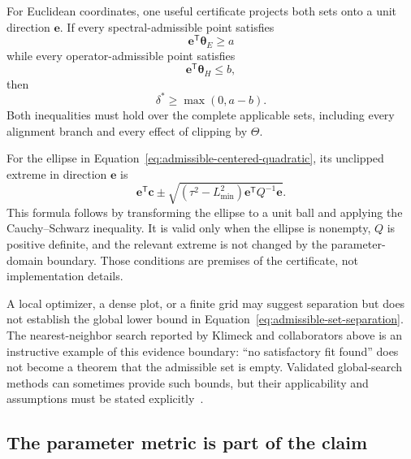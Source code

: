For Euclidean coordinates, one useful certificate projects both sets onto a
unit direction $\mathbf e$. If every spectral-admissible point satisfies
\begin{equation}
  \mathbf e^{\mathsf T}\boldsymbol\theta_E\geq a
\end{equation}
while every operator-admissible point satisfies
\begin{equation}
  \mathbf e^{\mathsf T}\boldsymbol\theta_H\leq b,
\end{equation}
then
\begin{equation}
  \delta^{\ast}\geq\max(0,a-b).
  \label{eq:admissible-directional-lower-bound}
\end{equation}
Both inequalities must hold over the complete applicable sets, including every
alignment branch and every effect of clipping by $\Theta$.

For the ellipse in Equation~\eqref{eq:admissible-centered-quadratic}, its
unclipped extreme in direction $\mathbf e$ is
\begin{equation}
  \mathbf e^{\mathsf T}\mathbf c
  \mathbin{\pm}
  \sqrt{
    (\tau^2-L_{\min}^2)
    \mathbf e^{\mathsf T}Q^{-1}\mathbf e
  }.
  \label{eq:admissible-ellipse-directional-extreme}
\end{equation}
This formula follows by transforming the ellipse to a unit ball and applying
the Cauchy--Schwarz inequality. It is valid only when the ellipse is nonempty,
$Q$ is positive definite, and the relevant extreme is not changed by the
parameter-domain boundary. Those conditions are premises of the certificate,
not implementation details.

A local optimizer, a dense plot, or a finite grid may suggest separation but
does not establish the global lower bound in
Equation~\eqref{eq:admissible-set-separation}. The nearest-neighbor search
reported by Klimeck and collaborators above is an instructive example of this
evidence boundary: ``no satisfactory fit found'' does not become a theorem
that the admissible set is empty. Validated global-search methods can sometimes
provide such bounds, but their applicability and assumptions must be stated
explicitly~\cite{neumaier2004,mooreKearfottCloud2009}.

\subsection{The parameter metric is part of the claim}

